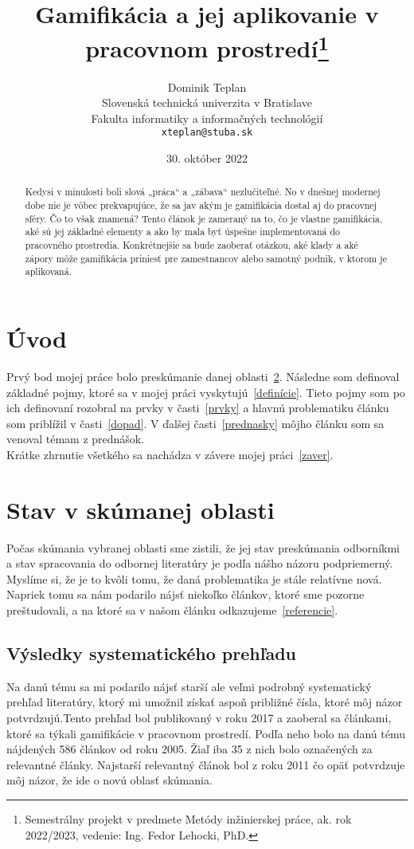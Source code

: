 \documentclass{article}
\title{Gamifikácia a jej aplikovanie v pracovnom prostredí\thanks{Semestrálny projekt v predmete Metódy inžinierskej práce, ak. rok 2022/2023, vedenie: Ing. Fedor Lehocki, PhD.}} %
\author{Dominik Teplan\\[2pt]
	{\small Slovenská technická univerzita v Bratislave}\\
	{\small Fakulta informatiky a informačných technológií}\\
	{\small \texttt{xteplan@stuba.sk}}
	}
\date{\small 30. október 2022} %
\begin{document}
\maketitle

\begin{abstract}
Kedysi v minulosti boli slová „práca“ a „zábava“ nezlučiteľné. No v dnešnej modernej dobe nie je vôbec prekvapujúce, že sa jav akým je gamifikácia dostal aj do pracovnej sféry. Čo to však znamená? 
Tento článok je zameraný na to, čo je vlastne gamifikácia, aké sú jej základné elementy a ako by mala byť úspešne implementovaná do pracovného prostredia. Konkrétnejšie sa bude zaoberať otázkou, aké klady a aké zápory môže gamifikácia priniesť pre zamestnancov alebo samotný podnik, v ktorom je aplikovaná.


\end{abstract}



\section{Úvod}

Prvý bod mojej práce bolo preskúmanie danej oblasti~\ref{stav}. Následne som definoval základné pojmy, ktoré sa v mojej práci vyskytujú~\ref{definície}. Tieto pojmy som po ich definovaní rozobral na prvky v časti~\ref{prvky} a hlavnú problematiku článku som priblížil v časti~\ref{dopad}. V ďalšej časti~\ref{prednasky} môjho článku som sa venoval témam z prednášok.
\\ Krátke zhrnutie všetkého sa nachádza v závere mojej práci~\ref{zaver}.

\section{Stav v skúmanej oblasti}\label{stav} 

Počas skúmania vybranej oblasti sme zistili, že jej stav preskúmania odborníkmi a stav spracovania do odbornej literatúry je podľa nášho názoru podpriemerný. Myslíme si, že je to kvôli tomu, že daná problematika je stále relatívne nová. Napriek tomu sa nám podarilo nájsť niekoľko článkov, ktoré sme pozorne preštudovali, a na ktoré sa v našom článku odkazujeme~\ref{referencie}. 

\subsection{Výsledky systematického prehľadu} 
Na danú tému sa mi podarilo nájsť starší ale veľmi podrobný systematický prehľad literatúry, ktorý mi umožnil získať aspoň približné čísla, ktoré môj názor potvrdzujú\cite{10.1007/978-3-319-56541-5_29}.Tento prehľad bol publikovaný v roku 2017 a zaoberal sa článkami, ktoré sa týkali gamifikácie v pracovnom prostredí. Podľa neho bolo na danú tému nájdených 586 článkov od roku 2005. Žiaľ iba 35 z nich bolo označených za relevantné články. Najstarší relevantný článok bol z roku 2011 čo opäť potvrdzuje môj názor, že ide o novú oblasť skúmania.
\end{document}
